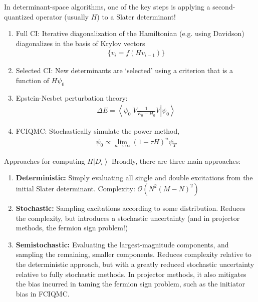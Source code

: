 \documentclass[amsmath]{beamer}
\begin{document}
\begin{frame}
	\small
	In determinant-space algorithms, one of the key steps is applying a second-quantized operator (usually $H$) to a Slater determinant!
	\begin{enumerate}
		\item Full CI: Iterative diagonalization of the Hamiltonian (e.g. using Davidson) diagonalizes in the basis of Krylov vectors \begin{eqnarray}\{v_i=f(Hv_{i-1})\}\end{eqnarray}
		\item Selected CI: New determinants are `selected' using a criterion that is a function of $H\psi_0$
		\item Epstein-Nesbet perturbation theory: \begin{eqnarray}\Delta E = \left\langle \psi_0 \left| V \frac{1}{E_0 - H_0} V \right|\psi_0\right\rangle\end{eqnarray}
		\item FCIQMC: Stochastically simulate the power method, \begin{eqnarray}\psi_0 \propto \lim_{n\rightarrow\infty} (1 - \tau H)^n \psi_T\end{eqnarray}
	\end{enumerate}
\end{frame}

\begin{frame}{Approaches for computing $H\left|D_i\right\rangle$}
	\small
	Broadly, there are three main approaches:
	\begin{enumerate}
		\item {\bf Deterministic:} Simply evaluating all single and double excitations from the initial Slater determinant. Complexity: $\mathcal{O}(N^2 (M-N)^2)$
		\item {\bf Stochastic:} Sampling excitations according to some distribution. Reduces the complexity, but introduces a stochastic uncertainty (and in projector methods, the fermion sign problem!)
		\item {\bf Semistochastic:} Evaluating the largest-magnitude components, and sampling the remaining, smaller components. Reduces complexity relative to the deterministic approach, but with a greatly reduced stochastic uncertainty relative to fully stochastic methods. In projector methods, it also mitigates the bias incurred in taming the fermion sign problem, such as the initiator bias in FCIQMC.
	\end{enumerate}
\end{frame}
\end{document}
